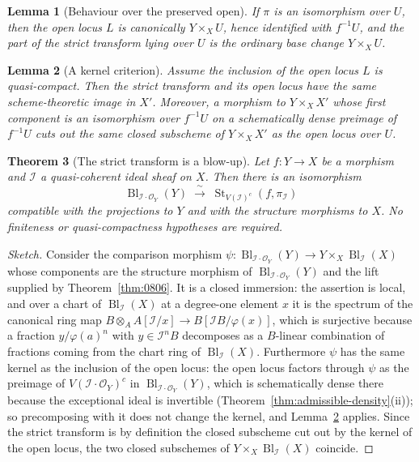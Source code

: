 \documentclass[11pt,a4paper]{article}
\theoremstyle{plain}
\newtheorem{theorem}{Theorem}[section]
\newtheorem{lemma}[theorem]{Lemma}
\theoremstyle{definition}
\theoremstyle{remark}
\newcommand{\Bl}{\operatorname{Bl}}
\newcommand{\sO}{\mathcal{O}}
\newcommand{\sI}{\mathcal{I}}
\newcommand{\stt}[3]{\operatorname{St}_{#3}(#1,#2)}
\begin{document}
\begin{lemma}[Behaviour over the preserved open]
\label{lem:strict-transform-over-U}
If $\pi$ is an isomorphism over $U$, then the open locus $L$ is canonically
$Y\times_X U$, hence identified with $f^{-1}U$, and the part of the strict
transform lying over $U$ is the ordinary base change $Y\times_X U$.
\end{lemma}

\begin{lemma}[A kernel criterion]
\label{lem:kernel-criterion}
Assume the inclusion of the open locus $L$ is quasi-compact. Then the strict
transform and its open locus have the same scheme-theoretic image in $X'$.
Moreover, a morphism to $Y\times_X X'$ whose first component is an isomorphism
over $f^{-1}U$ on a schematically dense preimage of $f^{-1}U$ cuts out the same
closed subscheme of $Y\times_X X'$ as the open locus over $U$.
\end{lemma}

\begin{theorem}[The strict transform is a blow-up]
\label{thm:080E}
Let $f\colon Y\to X$ be a morphism and $\sI$ a quasi-coherent ideal sheaf on
$X$. Then there is an isomorphism
\[
  \Bl_{\sI\cdot\sO_Y}(Y)\;\xrightarrow{\ \sim\ }\;
  \stt{f}{\pi_\sI}{V(\sI)^{c}}
\]
compatible with the projections to $Y$ and with the structure morphisms to $X$.
No finiteness or quasi-compactness hypotheses are required.
\end{theorem}

\begin{proof}[Sketch]
Consider the comparison morphism
$\psi\colon\Bl_{\sI\cdot\sO_Y}(Y)\to Y\times_X\Bl_\sI(X)$ whose components are
the structure morphism of $\Bl_{\sI\cdot\sO_Y}(Y)$ and the lift supplied by
Theorem~\ref{thm:0806}. It is a closed immersion: the assertion is local, and
over a chart of $\Bl_\sI(X)$ at a degree-one element $x$ it is the spectrum of
the canonical ring map $B\otimes_A A[\sI/x]\to B[\sI B/\varphi(x)]$, which is
surjective because a fraction $y/\varphi(a)^n$ with $y\in\sI^nB$ decomposes as a
$B$-linear combination of fractions coming from the chart ring of $\Bl_\sI(X)$.
Furthermore $\psi$ has the same kernel as the inclusion of the open locus: the
open locus factors through $\psi$ as the preimage of $V(\sI\cdot\sO_Y)^{c}$ in
$\Bl_{\sI\cdot\sO_Y}(Y)$, which is schematically dense there because the
exceptional ideal is invertible (Theorem~\ref{thm:admissible-density}(ii)); so
precomposing with it does not change the kernel, and
Lemma~\ref{lem:kernel-criterion} applies. Since the strict transform is by
definition the closed subscheme cut out by the kernel of the open locus, the
two closed subschemes of $Y\times_X\Bl_\sI(X)$ coincide.
\end{proof}
\end{document}
